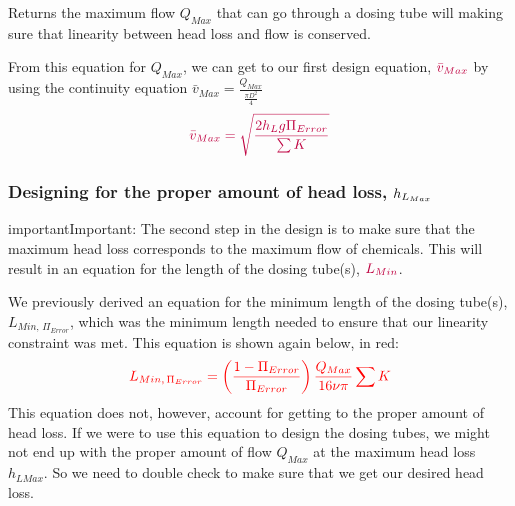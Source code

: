\documentclass[letterpaper,10pt,english]{sphinxmanual}
\begin{document}


  Returns the maximum flow \(Q_{Max}\) that can go through a dosing tube will making sure that linearity between head loss and flow is conserved.



From this equation for \(Q_{Max}\), we can get to our first design equation, \(\color{purple}{\bar v_{Max}}\) by using the continuity equation \(\bar v_{Max} = \frac{Q_{Max}}{\frac{\pi D^2}{4}}\)
\begin{equation}\label{equation:Flow_Control_and_Measurement/FCM_Derivations:Flow_Control_and_Measurement/FCM_Derivations:33}
\begin{split}\color{purple}{
  \bar v_{Max} = \sqrt{ \frac{2 h_L g \Pi_{Error}}{\sum{K} }}
  }\end{split}
\end{equation}

\subsubsection{Designing for the proper amount of head loss, \protect\(h_{L_{Max}}\protect\)}
\label{\detokenize{Flow_Control_and_Measurement/FCM_Derivations:designing-for-the-proper-amount-of-head-loss}}
\begin{sphinxadmonition}{important}{Important:}
The second step in the design is to make sure that the maximum head loss corresponds to the maximum flow of chemicals. This will result in an equation for the length of the dosing tube(s), \(\color{purple}{L_{Min} }\).
\end{sphinxadmonition}

We previously derived an equation for the minimum length of the dosing tube(s), \(L_{Min, \, \Pi_{Error}}\), which was the minimum length needed to ensure that our linearity constraint was met. This equation is shown again below, in red:
\begin{equation}\label{equation:Flow_Control_and_Measurement/FCM_Derivations:Flow_Control_and_Measurement/FCM_Derivations:34}
\begin{split}\color{red}{
  L_{Min, \, \Pi_{Error}} = \left( \frac{1 - \Pi_{Error}}{\Pi_{Error}} \right) \frac{Q_{Max}}{16 \nu \pi} \sum{K}
  }\end{split}
\end{equation}
This equation does not, however, account for getting to the proper amount of head loss. If we were to use this equation to design the dosing tubes, we might not end up with the proper amount of flow \(Q_{Max}\) at the maximum head loss \(h_{L{Max}}\). So we need to double check to make sure that we get our desired head loss.
\end{document}
